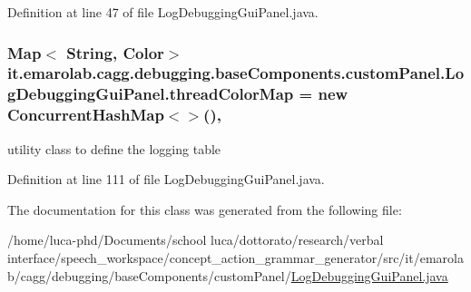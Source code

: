 Definition at line 47 of file Log\-Debugging\-Gui\-Panel.\-java.

\hypertarget{classit_1_1emarolab_1_1cagg_1_1debugging_1_1baseComponents_1_1customPanel_1_1LogDebuggingGuiPanel_afb89a234014986b247c5feb456bcfd3c}{
\subsubsection[{thread\-Color\-Map}]{\setlength{\rightskip}{0pt plus 5cm}Map$<$ String, Color$>$ it.\-emarolab.\-cagg.\-debugging.\-base\-Components.\-custom\-Panel.\-Log\-Debugging\-Gui\-Panel.\-thread\-Color\-Map = new Concurrent\-Hash\-Map$<$$>$()\hspace{0.3cm}{\ttfamily [static]}, {\ttfamily [private]}}}\label{classit_1_1emarolab_1_1cagg_1_1debugging_1_1baseComponents_1_1customPanel_1_1LogDebuggingGuiPanel_afb89a234014986b247c5feb456bcfd3c}


utility class to define the logging table 



Definition at line 111 of file Log\-Debugging\-Gui\-Panel.\-java.



The documentation for this class was generated from the following file\-:\begin{DoxyCompactItemize}
\item 
/home/luca-\/phd/\-Documents/school luca/dottorato/research/verbal interface/speech\-\_\-workspace/concept\-\_\-action\-\_\-grammar\-\_\-generator/src/it/emarolab/cagg/debugging/base\-Components/custom\-Panel/\hyperlink{LogDebuggingGuiPanel_8java}{Log\-Debugging\-Gui\-Panel.\-java}\end{DoxyCompactItemize}
